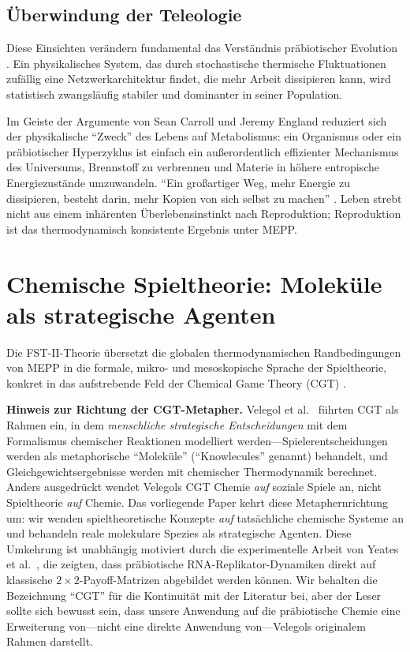 \documentclass[12pt,a4paper]{article}
\theoremstyle{remark}
\begin{document}
\subsection{\"Uberwindung der Teleologie}

Diese Einsichten ver\"andern fundamental das Verst\"andnis pr\"abiotischer Evolution \citep{UnbecomingBeing}. Ein physikalisches System, das durch stochastische thermische Fluktuationen zuf\"allig eine Netzwerkarchitektur findet, die mehr Arbeit dissipieren kann, wird statistisch zwangsl\"aufig stabiler und dominanter in seiner Population.

Im Geiste der Argumente von Sean Carroll \citep{UnbecomingBeing} und Jeremy England \citep{England2013} reduziert sich der physikalische ``Zweck'' des Lebens auf Metabolismus: ein Organismus oder ein pr\"abiotischer Hyperzyklus ist einfach ein au\ss{}erordentlich effizienter Mechanismus des Universums, Brennstoff zu verbrennen und Materie in h\"ohere entropische Energiezust\"ande umzuwandeln. ``Ein gro\ss{}artiger Weg, mehr Energie zu dissipieren, besteht darin, mehr Kopien von sich selbst zu machen'' \citep{England2013}. Leben strebt nicht aus einem inh\"arenten \"Uberlebensinstinkt nach Reproduktion; Reproduktion ist das thermodynamisch konsistente Ergebnis unter MEPP.

\section{Chemische Spieltheorie: Molek\"ule als strategische Agenten}
\label{sec:cgt}

Die FST-II-Theorie \"ubersetzt die globalen thermodynamischen Randbedingungen von MEPP in die formale, mikro- und mesoskopische Sprache der Spieltheorie, konkret in das aufstrebende Feld der Chemical Game Theory (CGT) \citep{CGT2018,CGTMacmillan}.

\textbf{Hinweis zur Richtung der CGT-Metapher.} Velegol et al.~\citep{CGT2018} f\"uhrten CGT als Rahmen ein, in dem \emph{menschliche strategische Entscheidungen} mit dem Formalismus chemischer Reaktionen modelliert werden---Spielerentscheidungen werden als metaphorische ``Molek\"ule'' (``Knowlecules'' genannt) behandelt, und Gleichgewichtsergebnisse werden mit chemischer Thermodynamik berechnet. Anders ausgedr\"uckt wendet Velegols CGT Chemie \emph{auf} soziale Spiele an, nicht Spieltheorie \emph{auf} Chemie. Das vorliegende Paper kehrt diese Metaphernrichtung um: wir wenden spieltheoretische Konzepte \emph{auf} tats\"achliche chemische Systeme an und behandeln reale molekulare Spezies als strategische Agenten. Diese Umkehrung ist unabh\"angig motiviert durch die experimentelle Arbeit von Yeates et al.~\citep{AzoarcusPNAS}, die zeigten, dass pr\"abiotische RNA-Replikator-Dynamiken direkt auf klassische $2\times 2$-Payoff-Matrizen abgebildet werden k\"onnen. Wir behalten die Bezeichnung ``CGT'' f\"ur die Kontinuit\"at mit der Literatur bei, aber der Leser sollte sich bewusst sein, dass unsere Anwendung auf die pr\"abiotische Chemie eine Erweiterung von---nicht eine direkte Anwendung von---Velegols originalem Rahmen darstellt.
\end{document}
